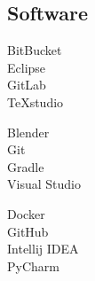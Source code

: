 \documentclass[curriculum-vitae-ita]{subfiles}
\begin{document}
		\subsection*{Software}
			\begin{minipage}[t]{.3\textwidth}
				BitBucket \hfill {}\\
				Eclipse \hfill {}\\
				GitLab \hfill {}\\
				TeXstudio \hfill {}\\  %
			\end{minipage}
			\hfill
			\begin{minipage}[t]{.3\textwidth}
				Blender \hfill {}\\
				Git \hfill {}\\
				Gradle \hfill {}\\
				Visual Studio \hfill {}\\  %
			\end{minipage}
			\hfill
			\begin{minipage}[t]{.3\textwidth}
				Docker \hfill {}\\
				GitHub \hfill {}\\
				Intellij IDEA \hfill {}\\
				PyCharm \hfill {}\\ %
			\end{minipage}
\end{document}
